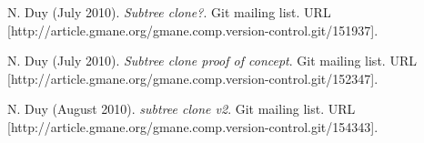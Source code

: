 \documentclass[preprint]{sigplanconf}
\begin{document}
\begin{thebibliography}{10}
    N. Duy (July 2010).
    \newblock \emph{Subtree clone?}.
    \newblock Git mailing list.
    \newblock URL
    [http://article.gmane.org/gmane.comp.version-control.git/151937].

    N. Duy (July 2010).
    \newblock \emph{Subtree clone proof of concept}.
    \newblock Git mailing list.
    \newblock URL
    [http://article.gmane.org/gmane.comp.version-control.git/152347].

    N. Duy (August 2010).
    \newblock \emph{subtree clone v2}.
    \newblock Git mailing list.
    \newblock URL
    [http://article.gmane.org/gmane.comp.version-control.git/154343].

\end{thebibliography}
\end{document}
